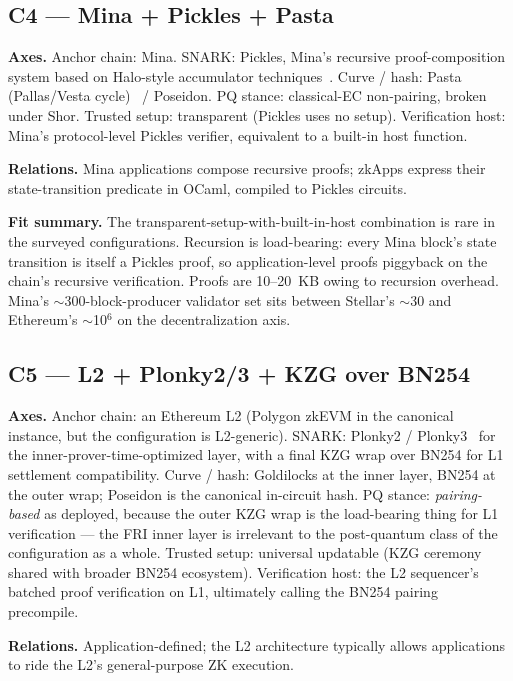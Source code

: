 \subsection{C4 --- Mina + Pickles + Pasta}
\label{sec:cfg-c4}

\textbf{Axes.} Anchor chain: Mina. SNARK: Pickles, Mina's recursive
proof-composition system based on Halo-style accumulator
techniques~\cite{bowe-2019-halo}. Curve / hash:
Pasta (Pallas/Vesta cycle)~\cite{hopwood-2020-pasta} / Poseidon. PQ
stance: classical-EC non-pairing, broken under Shor.
Trusted setup: transparent (Pickles uses no setup). Verification host:
Mina's protocol-level Pickles verifier, equivalent to a built-in
host function.

\textbf{Relations.} Mina applications compose recursive proofs;
zkApps express their state-transition predicate in OCaml, compiled to
Pickles circuits.

\textbf{Fit summary.} The transparent-setup-with-built-in-host
combination is rare in the surveyed configurations. Recursion is
load-bearing: every Mina block's state transition is itself a Pickles
proof, so application-level proofs piggyback on the chain's recursive
verification. Proofs are 10--20~KB owing to recursion overhead.
Mina's $\sim$300-block-producer validator set sits between Stellar's
$\sim$30 and Ethereum's $\sim$10$^6$ on the decentralization axis.

\subsection{C5 --- L2 + Plonky2/3 + KZG over BN254}
\label{sec:cfg-c5}

\textbf{Axes.} Anchor chain: an Ethereum L2 (Polygon zkEVM in the
canonical instance, but the configuration is L2-generic). SNARK:
Plonky2 / Plonky3~\cite{plonky2-2022,plonky3-spec} for the
inner-prover-time-optimized layer, with a final KZG wrap over BN254
for L1 settlement compatibility. Curve / hash: Goldilocks at the
inner layer, BN254 at the outer wrap; Poseidon is the canonical
in-circuit hash. PQ stance: \emph{pairing-based} as deployed,
because the outer KZG wrap is the load-bearing thing for L1
verification --- the FRI inner layer is irrelevant to the
post-quantum class of the configuration as a whole. Trusted setup:
universal updatable (KZG ceremony shared with broader BN254
ecosystem). Verification host: the L2 sequencer's batched proof
verification on L1, ultimately calling the BN254 pairing precompile.

\textbf{Relations.} Application-defined; the L2 architecture
typically allows applications to ride the L2's general-purpose ZK
execution.

